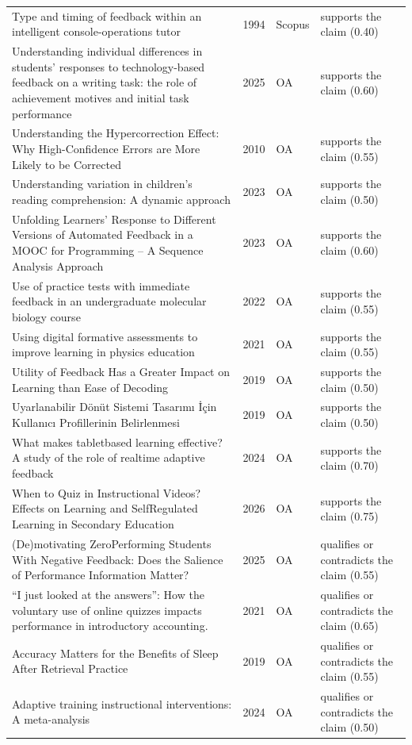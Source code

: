 \begin{longtable}{@{}%
  >{\raggedright\arraybackslash}p{}c%
  >{\raggedright\arraybackslash}p{}%
  >{\raggedright\arraybackslash}p{}@{}}
Type and timing of feedback within an intelligent console-operations tutor & 1994 & Scopus & supports the claim (0.40) \\
Understanding individual differences in students' responses to technology-based feedback on a writing task: the role of achievement motives and initial task performance & 2025 & OA & supports the claim (0.60) \\
Understanding the Hypercorrection Effect: Why High-Confidence Errors are More Likely to be Corrected & 2010 & OA & supports the claim (0.55) \\
Understanding variation in children's reading comprehension: A dynamic approach & 2023 & OA & supports the claim (0.50) \\
Unfolding Learners' Response to Different Versions of Automated Feedback in a MOOC for Programming -- A Sequence Analysis Approach & 2023 & OA & supports the claim (0.60) \\
Use of practice tests with immediate feedback in an undergraduate molecular biology course & 2022 & OA & supports the claim (0.55) \\
Using digital formative assessments to improve learning in physics education & 2021 & OA & supports the claim (0.55) \\
Utility of Feedback Has a Greater Impact on Learning than Ease of Decoding & 2019 & OA & supports the claim (0.50) \\
Uyarlanabilir Dönüt Sistemi Tasarımı İçin Kullanıcı Profillerinin Belirlenmesi & 2019 & OA & supports the claim (0.50) \\
What makes tabletbased learning effective? A study of the role of realtime adaptive feedback & 2024 & OA & supports the claim (0.70) \\
When to Quiz in Instructional Videos? Effects on Learning and SelfRegulated Learning in Secondary Education & 2026 & OA & supports the claim (0.75) \\
(De)motivating ZeroPerforming Students With Negative Feedback: Does the Salience of Performance Information Matter? & 2025 & OA & qualifies or contradicts the claim (0.55) \\
``I just looked at the answers'': How the voluntary use of online quizzes impacts performance in introductory accounting. & 2021 & OA & qualifies or contradicts the claim (0.65) \\
Accuracy Matters for the Benefits of Sleep After Retrieval Practice & 2019 & OA & qualifies or contradicts the claim (0.55) \\
Adaptive training instructional interventions: A meta-analysis & 2024 & OA & qualifies or contradicts the claim (0.50) \\

\end{longtable}
